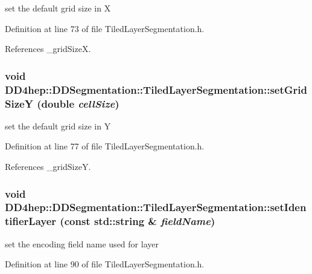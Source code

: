 set the default grid size in X 

Definition at line 73 of file TiledLayerSegmentation.h.

References \_\-gridSizeX.\hypertarget{class_d_d4hep_1_1_d_d_segmentation_1_1_tiled_layer_segmentation_a1d3f9e083551c3a67500d7da77d33684}{
\subsubsection[{setGridSizeY}]{\setlength{\rightskip}{0pt plus 5cm}void DD4hep::DDSegmentation::TiledLayerSegmentation::setGridSizeY (double {\em cellSize})}}
\label{class_d_d4hep_1_1_d_d_segmentation_1_1_tiled_layer_segmentation_a1d3f9e083551c3a67500d7da77d33684}


set the default grid size in Y 

Definition at line 77 of file TiledLayerSegmentation.h.

References \_\-gridSizeY.\hypertarget{class_d_d4hep_1_1_d_d_segmentation_1_1_tiled_layer_segmentation_a3fed8d866ede1df684ec06344725b72c}{
\subsubsection[{setIdentifierLayer}]{\setlength{\rightskip}{0pt plus 5cm}void DD4hep::DDSegmentation::TiledLayerSegmentation::setIdentifierLayer (const std::string \& {\em fieldName})}}
\label{class_d_d4hep_1_1_d_d_segmentation_1_1_tiled_layer_segmentation_a3fed8d866ede1df684ec06344725b72c}


set the encoding field name used for layer 

Definition at line 90 of file TiledLayerSegmentation.h.

